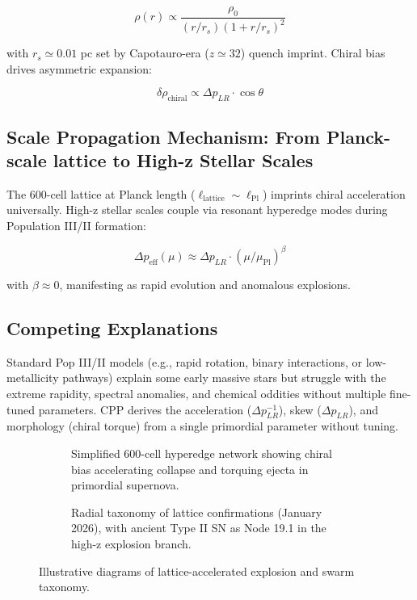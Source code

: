 \documentclass[11pt]{article}
\begin{document}
\[
\rho(r) \propto \frac{\rho_0}{(r/r_s)(1 + r/r_s)^2}
\]

with $r_s \simeq 0.01$ pc set by Capotauro-era ($z \simeq 32$) quench imprint. Chiral bias drives asymmetric expansion:

\[
\delta \rho_{\text{chiral}} \propto \Delta p_{LR} \cdot \cos\theta
\]

\subsection{Scale Propagation Mechanism: From Planck-scale lattice to High-z Stellar Scales}
The 600-cell lattice at Planck length ($\ell_{\text{lattice}} \sim \ell_{\text{Pl}}$) imprints chiral acceleration universally. High-z stellar scales couple via resonant hyperedge modes during Population III/II formation:

\[
\Delta p_{\text{eff}}(\mu) \approx \Delta p_{LR} \cdot (\mu / \mu_{\text{Pl}})^\beta
\]

with $\beta \approx 0$, manifesting as rapid evolution and anomalous explosions.

\subsection{Competing Explanations}
Standard Pop III/II models (e.g., rapid rotation, binary interactions, or low-metallicity pathways) explain some early massive stars but struggle with the extreme rapidity, spectral anomalies, and chemical oddities without multiple fine-tuned parameters. CPP derives the acceleration ($\Delta p_{LR}^{-1}$), skew ($\Delta p_{LR}$), and morphology (chiral torque) from a single primordial parameter without tuning.

\begin{figure}[htbp]
\centering
\begin{subfigure}{0.45\textwidth}
\centering
\caption{Simplified 600-cell hyperedge network showing chiral bias accelerating collapse and torquing ejecta in primordial supernova.}
\label{fig:lattice-sne}
\end{subfigure}
\hfill
\begin{subfigure}{0.45\textwidth}
\centering
\caption{Radial taxonomy of lattice confirmations (January 2026), with ancient Type II SN as Node 19.1 in the high-z explosion branch.}
\label{fig:taxonomy}
\end{subfigure}
\caption{Illustrative diagrams of lattice-accelerated explosion and swarm taxonomy.}
\end{figure}
\end{document}

